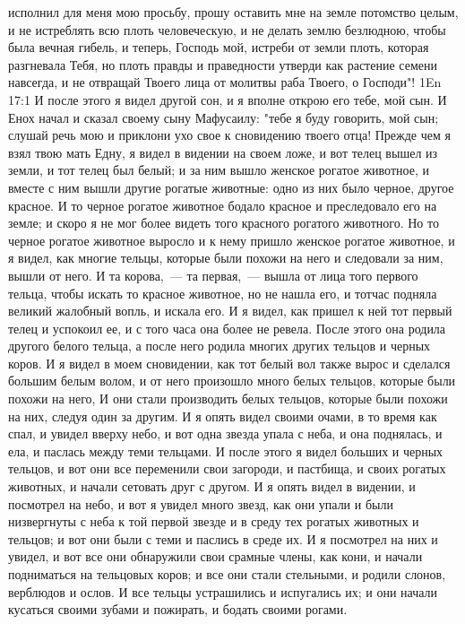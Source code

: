 исполнил для меня мою просьбу, прошу оставить мне на земле потомство целым, и
не истреблять всю плоть человеческую, и не делать землю безлюдною, чтобы была
вечная гибель, и теперь, Господь мой, истреби от земли плоть, которая
разгневала Тебя, но плоть правды и праведности утверди как растение семени
навсегда, и не отвращай Твоего лица от молитвы раба Твоего, о Господи"!
\vs 1En 17:1
И после этого я видел другой сон, и я вполне открою его тебе, мой
сын.
И Енох начал и сказал своему сыну Мафусаилу: "тебе я буду говорить,
мой сын; слушай речь мою и приклони ухо свое к сновидению твоего отца!
Прежде чем я взял твою мать Едну, я видел в видении на своем ложе, и
вот телец вышел из земли, и тот телец был белый; и за ним вышло женское рогатое
животное, и вместе с ним вышли другие рогатые животные: одно из них было
черное, другое красное.
И то черное рогатое животное бодало красное и преследовало его на
земле; и скоро я не мог более видеть того красного рогатого животного.
Но то черное рогатое животное выросло и к нему пришло женское рогатое
животное, и я видел, как многие тельцы, которые были похожи на него и следовали
за ним, вышли от него.
И та корова,~--- та первая,~--- вышла от лица того первого тельца, чтобы
искать то красное животное, но не нашла его, и тотчас подняла великий жалобный
вопль, и искала его.
И я видел, как пришел к ней тот первый телец и успокоил ее, и с того
часа она более не ревела.
После этого она родила другого белого тельца, а после него родила
многих других тельцов и черных коров.
И я видел в моем сновидении, как тот белый вол также вырос и сделался
большим белым волом, и от него произошло много белых тельцов, которые были
похожи на него, И они стали производить белых тельцов, которые были похожи на
них, следуя один за другим.
И я опять видел своими очами, в то время как спал, и увидел
вверху небо, и вот одна звезда упала с неба, и она поднялась, и ела, и паслась
между теми тельцами.
И после этого я видел больших и черных тельцов, и вот они все
переменили свои загороди, и пастбища, и своих рогатых животных, и начали
сетовать друг с другом.
И я опять видел в видении, и посмотрел на небо, и вот я увидел много
звезд, как они упали и были низвергнуты с неба к той первой звезде и в среду
тех рогатых животных и тельцов; и вот они были с теми и паслись в среде их.
И я посмотрел на них и увидел, и вот все они обнаружили свои срамные
члены, как кони, и начали подниматься на тельцовых коров; и все они стали
стельными, и родили слонов, верблюдов и ослов.
И все тельцы устрашились и испугались их; и они начали кусаться своими
зубами и пожирать, и бодать своими рогами.
